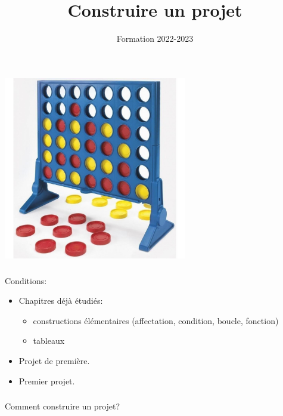 \documentclass[svgnames,11pt]{beamer}
\author[]{Formation 2022-2023}
\title{Construire un projet}
\date{\framebox{\textbf{NSI}}}
\begin{document}
\begin{frame}
    \titlepage
\end{frame}
\begin{frame}
    \frametitle{}

    \begin{center}
        \centering
        \includegraphics[width=8cm]{ressources/puissance4.jpg}
        \label{IMG}
    \end{center}

\end{frame}
\begin{frame}
    \frametitle{}

    Conditions:
    \begin{itemize}
        \item Chapitres déjà étudiés:
              \begin{itemize}
                  \item constructions élémentaires (affectation, condition, boucle, fonction)
                  \item tableaux
              \end{itemize}
        \item Projet de première.
        \item Premier projet.
    \end{itemize}

\end{frame}
\begin{frame}
    \frametitle{}

    \begin{framed}
        \centering Comment construire un projet?
    \end{framed}

\end{frame}
\end{document}
